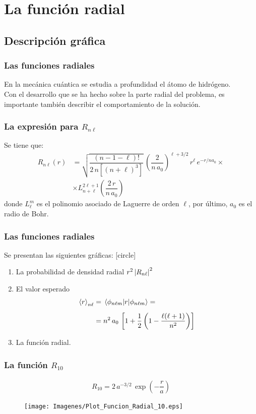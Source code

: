 \documentclass[12pt]{beamer}
\begin{document}
\section{La función radial}
\subsection{Descripción gráfica}
\begin{frame}
\frametitle{Las funciones radiales}
En la mecánica cuántica se estudia a profundidad el átomo de hidrógeno.
\\
\bigskip
\pause
Con el desarrollo que se ha hecho sobre la parte radial del problema, es importante también describir el comportamiento de la solución.
\end{frame}
\begin{frame}
\frametitle{La expresión para $R_{n \ell}$}
Se tiene que:
\begin{align*}
R_{n \ell} (r) &= \sqrt{\dfrac{(n - 1 -\ell)!}{2 \, n [(n + \ell)^{3}]}} \, \left( \dfrac{2}{n \, a_{0}} \right)^{\ell+3/2} \, r^{\ell} \, e^{-r/n a_{0}} \times \\[0.5em]
&\times L_{n+\ell}^{2 \ell+1} \left( \dfrac{2 \, r}{n \, a_{0}} \right)
\end{align*}
donde $L_{\ell}^{m}$ es el polinomio asociado de Laguerre de orden $\ell$, por último, $a_{0}$ es el radio de Bohr.
\end{frame}
\begin{frame}
\frametitle{Las funciones radiales}
Se presentan las siguientes gráficas:
[circle]
\begin{enumerate}[<+->]
\item La probabilidad de densidad radial $r^{2} \, \abs{R_{n \ell}}^{2}$
\item El valor esperado
\begin{align*}
\expval{r}_{n \ell} &= \expval{r}{\phi_{n \ell m}} = \\[0.5em]
&= n^{2} \, a_{0} \, \left[ 1 + \dfrac{1}{2} \left( 1 - \dfrac{\ell (\ell + 1)}{n^{2}} \right) \right]
\end{align*}
\item La función radial.
\end{enumerate}
\end{frame}
\begin{frame}
\frametitle{La función $R_{10}$}
\begin{align*}
R_{10} = 2 \, a^{-3/2} \, \exp(-\dfrac{r}{a})
\end{align*}
\pause
\vspace*{-0.5cm}
\begin{figure}
   \centering
   \texttt{[image: Imagenes/Plot\_Funcion\_Radial\_10.eps]}
\end{figure}
\end{frame}
\end{document}
